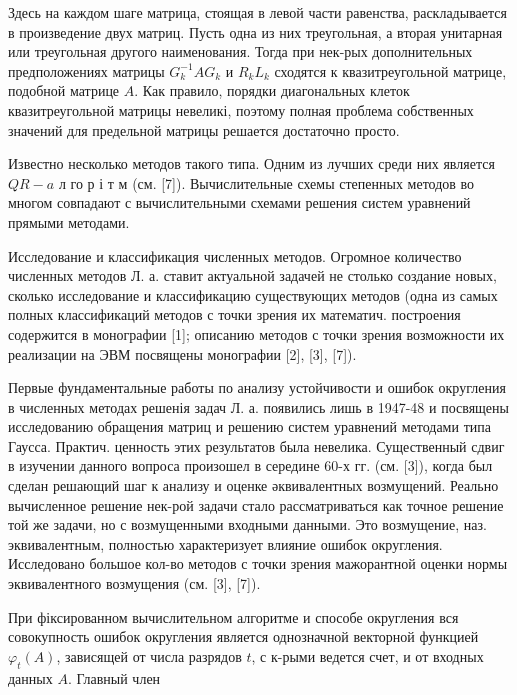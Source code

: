 \documentclass[10pt]{article}
\begin{document}
Здесь на каждом шаге матрица, стоящая в левой части равенства, раскладывается в произведение двух матриц. Пусть одна из них треугольная, а вторая унитарная или треугольная другого наименования. Тогда при нек-рых дополнительных предположениях матрицы $G_{k}^{-1} A G_{k}$ и $R_{k} L_{k}$ сходятся к квазитреугольной матрице, подобной матрице $A$. Как правило, порядки диагональных клеток квазитреугольной матрицы невеликі, поэтому полная проблема собственных значений для предельной матрицы решается достаточно просто.



Известно несколько методов такого типа. Одним из лучших среди них является $Q R-a$ л го р і т м (см. [7]). Вычислительные схемы степенных методов во многом совпадают с вычислительными схемами решения систем уравнений прямыми методами.



Исследование и классификация численных методов. Огромное количество численных методов Л. а. ставит актуальной задачей не столько создание новых, сколько исследование и классификацию существующих методов (одна из самых полных классификаций методов с точки зрения их математич. построения содержится в монографии [1]; описанию методов с точки зрения возможности их реализации на ЭВМ посвящены монографии [2], [3], [7]).



Первые фундаментальные работы по анализу устойчивости и ошибок округления в численных методах решенія задач Л. а. появились лишь в 1947-48 и посвящены исследованию обращения матриц и решению систем уравнений методами типа Гаусса. Практич. ценность этих результатов была невелика. Существенный сдвиг в изучении данного вопроса произошел в середине 60-х гг. (см. [3]), когда был сделан решающий шаг к анализу и оценке әквивалентных возмущений. Реально вычисленное решение нек-рой задачи стало рассматриваться как точное решение той же задачи, но с возмущенными входными данными. Это возмущение, наз. эквивалентным, полностью характеризует влияние ошибок округления. Исследовано большое кол-во методов с точки зрения мажорантной оценки нормы эквивалентного возмущения (см. [3], [7]).



При фіксированном вычислительном алгоритме и способе округления вся совокупность ошибок округления является однозначной векторной функцией $\varphi_{t}(A)$, зависящей от числа разрядов $t$, с к-рыми ведется счет, и от входных данных $A$. Главный член
\end{document}
